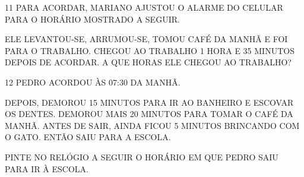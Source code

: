 \num{11} PARA ACORDAR, MARIANO AJUSTOU O ALARME DO CELULAR PARA O HORÁRIO MOSTRADO A SEGUIR.


ELE LEVANTOU-SE, ARRUMOU-SE, TOMOU CAFÉ DA MANHÃ E FOI PARA O TRABALHO. CHEGOU AO TRABALHO 1 HORA E 35 MINUTOS DEPOIS DE ACORDAR. A QUE HORAS ELE CHEGOU AO TRABALHO?


\num{12} PEDRO ACORDOU ÀS 07:30 DA MANHÃ.


DEPOIS, DEMOROU 15 MINUTOS PARA IR AO BANHEIRO E ESCOVAR OS DENTES.
DEMOROU MAIS 20 MINUTOS PARA TOMAR O CAFÉ DA MANHÃ. ANTES DE SAIR,
AINDA FICOU 5 MINUTOS BRINCANDO COM O GATO. ENTÃO SAIU PARA A ESCOLA.

PINTE NO RELÓGIO A SEGUIR O HORÁRIO EM QUE PEDRO SAIU PARA IR À ESCOLA.





